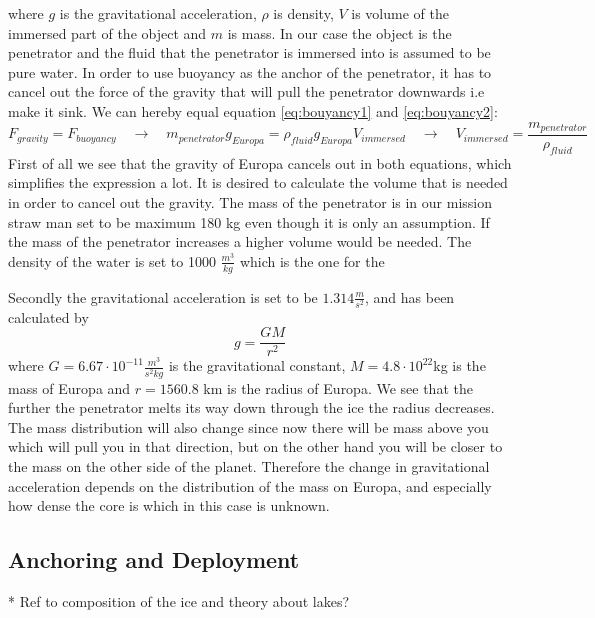 where $g$ is the gravitational acceleration, $\rho$ is density, $V$ is volume of the immersed part of the object and $m$ is mass.  In our case the object is the penetrator and the fluid that the penetrator is immersed into is assumed to be pure water. In order to use buoyancy as the anchor of the penetrator, it has to cancel out the force of the gravity that will pull the penetrator downwards i.e make it sink. We can hereby equal equation \ref{eq:bouyancy1} and \ref{eq:bouyancy2}:
\begin{equation}
F_{gravity} = F_{buoyancy} \quad \rightarrow \quad m_{penetrator}g_{Europa} = \rho_{fluid}g_{Europa} V_{immersed}   \quad \rightarrow \quad V_{immersed} = \frac{m_{penetrator}}{\rho_{fluid}}
\end{equation}
First of all we see that the gravity of Europa cancels out in both equations, which simplifies the expression a lot. It is desired to calculate the volume that is needed in order to cancel out the gravity. The mass of the penetrator is in our mission straw man set to be maximum 180 kg even though it is only an assumption. If the mass of the penetrator increases a higher volume would be needed. The density of the water is set to 1000 $\frac{m^3}{kg}$ which is the one for the 






Secondly the gravitational acceleration is set to be $1.314 \frac{m}{s^2}$, and has been calculated by 
\begin{equation}
g = \frac{GM}{r^2}
\end{equation} 
where $G = 6.67\cdot 10^{-11}\frac{m^3}{s^2 kg}$ is the gravitational constant, $M = 4.8\cdot 10^{22}$kg is the mass of Europa and $r = 1560.8$ km is the radius of Europa.  We see that the further the penetrator melts its way down through the ice the radius decreases. The mass distribution will also change since now there will be mass above you which will pull you in that direction, but on the other hand you will be closer to the mass on the other side of the planet. Therefore the change in gravitational acceleration depends on the distribution of the mass on Europa, and especially how dense the core is which in this case is unknown. 



\subsection{Anchoring and Deployment}

* Ref to composition of the ice and theory about lakes?

